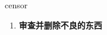 
\begin{frame}
{\huge censor}
\begin{center}
\begin{enumerate}\Large
  \item \textbf{审查并删除不良的东西}
\end{enumerate}
\end{center}
\end{frame}
